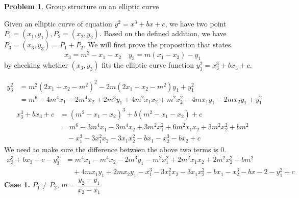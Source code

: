 \documentclass[12pt]{article}
\theoremstyle{definition}
\newtheorem{problem}{Problem}
\begin{document}
	\begin{problem}
		Group structure on an elliptic curve
	\end{problem}
	Given an elliptic curve of equation $y^2=x^3+bx+c$, we have two point $P_1=(x_1,y_1),P_2=(x_2,y_2)$.
	Based on the defined addition, we have $P_3 = (x_3,y_3) = P_1+P_2$. We will first prove the proposition that states 
	$$x_3=m^2-x_1-x_2 \quad y_3 = m(x_1-x_3)-y_1$$
	by checking whether $(x_3,y_3)$ fits the elliptic curve function $y_3^2=x_3^3+bx_3+c$.
	
	\begin{align*}
		y_3^2&=m^2(2x_1+x_2-m^2)^2-2m(2x_1+x_2-m^2)y_1+y_1^2\\
		&=m^6-4m^4x_1-2m^4x_2+2m^3y_1+4m^2x_1x_2+m^2x_2^2-4mx_1y_1-2mx_2y_1
		+y_1^2
	\end{align*}
	\begin{align*}
		x_3^3+bx_3+c&=(m^2-x_1-x_2)^3+b(m^2-x_1-x_2)+c\\
		&=m^6-3m^4x_1-3m^4x_2+3m^2x_1^2+6m^2x_1x_2+3m^2x_2^2+bm^2\\
		&\quad-x_1^3-3x_1^2x_2-3x_1x_2^2-bx_1-x_2^3-bx_2+c
	\end{align*}
	We need to make sure the difference between the above two terms is 0.
	\begin{align*}
		x_3^3+bx_3+c-y_3^2&=m^4x_1-m^4x_2-2m^3y_1-m^2x_1^2+2m^2x_1x_2+2m^2x_2^2+bm^2\\
		&\quad+4mx_1y_1+2mx_2y_1-x_1^3-3x_1^2x_2-3x_1x_2^2-bx_1-x_2^3-bx-2-y_1^2+c
	\end{align*}
	\textbf{Case 1.} $P_1\neq P_2$, $m=\dfrac{y_2-y_1}{x_2-x_1}$
	
\end{document}
